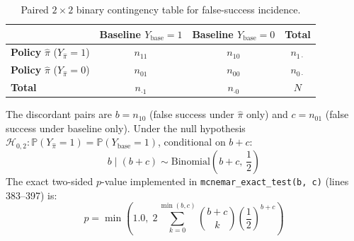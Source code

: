\documentclass[10pt,a4paper]{article}
\begin{document}
\begin{table}[h!]
\centering
\small
\begin{tabular}{lccc}
\toprule
& \textbf{Baseline} $Y_{\mathrm{base}} = 1$ & \textbf{Baseline} $Y_{\mathrm{base}} = 0$ & \textbf{Total} \\
\midrule
\textbf{Policy} $\hat{\pi}$ ($Y_{\hat{\pi}} = 1$) & $n_{11}$ & $n_{10}$ & $n_{1\cdot}$ \\
\textbf{Policy} $\hat{\pi}$ ($Y_{\hat{\pi}} = 0$) & $n_{01}$ & $n_{00}$ & $n_{0\cdot}$ \\
\midrule
\textbf{Total} & $n_{\cdot 1}$ & $n_{\cdot 0}$ & $N$ \\
\bottomrule
\end{tabular}
\caption{Paired $2 \times 2$ binary contingency table for false-success incidence.}
\label{tab:mcnemar}
\end{table}

\noindent The discordant pairs are $b = n_{10}$ (false success under $\hat{\pi}$ only) and $c = n_{01}$ (false success under baseline only). Under the null hypothesis $\mathcal{H}_{0,2}: \mathbb{P}(Y_{\hat{\pi}} = 1) = \mathbb{P}(Y_{\mathrm{base}} = 1)$, conditional on $b + c$:
\begin{equation}
b \mid (b + c) \sim \mathrm{Binomial}\left(b + c, \, \frac{1}{2}\right)
\end{equation}
The exact two-sided $p$-value implemented in \texttt{mcnemar\_exact\_test(b, c)} (lines 383--397) is:
\begin{equation}
p = \min\left(1.0, \; 2 \sum_{k=0}^{\min(b, c)} \binom{b + c}{k} \left(\frac{1}{2}\right)^{b + c}\right)
\end{equation}
\end{document}
